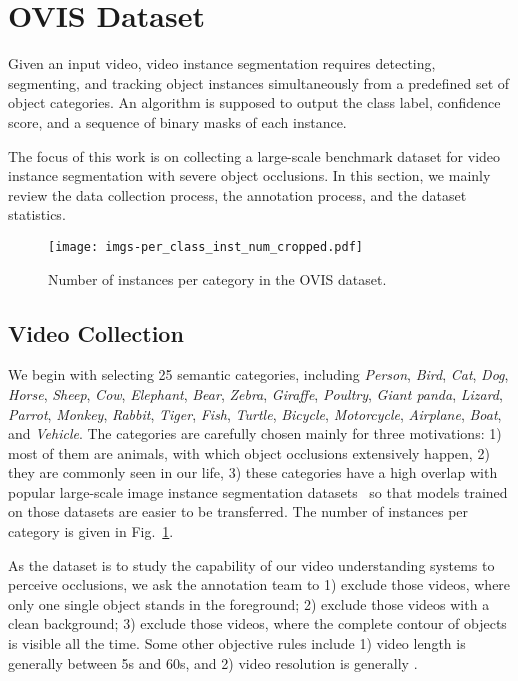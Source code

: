 \documentclass[twocolumn]{svjour3}          \smartqed  \usepackage{graphicx}
\begin{document}
\begin{sloppypar}
\section{OVIS Dataset}

Given an input video, video instance segmentation requires detecting, segmenting, and tracking object instances simultaneously from a predefined set of object categories. An algorithm is supposed to output the class label, confidence score, and a sequence of binary masks of each instance.

The focus of this work is on collecting a large-scale benchmark dataset for video instance segmentation with severe object occlusions. In this section, we mainly review the data collection process, the annotation process, and the dataset statistics.

\begin{figure}[t]
\centering
         \texttt{[image: imgs-per\_class\_inst\_num\_cropped.pdf]}
         \caption{Number of instances per category in the
         OVIS dataset.}
      \label{fig:instance_per_cate}
\end{figure}

\subsection{Video Collection}

We begin with selecting 25 semantic categories, including \textit{Person}, \textit{Bird}, \textit{Cat}, \textit{Dog}, \textit{Horse}, \textit{Sheep}, \textit{Cow}, \textit{Elephant}, \textit{Bear}, \textit{Zebra}, \textit{Giraffe}, \textit{Poultry}, \textit{Giant panda}, \textit{Lizard}, \textit{Parrot}, \textit{Monkey}, \textit{Rabbit}, \textit{Tiger}, \textit{Fish}, \textit{Turtle}, \textit{Bicycle}, \textit{Motorcycle}, \textit{Airplane}, \textit{Boat}, and \textit{Vehicle}. The categories are carefully chosen mainly for three motivations: 1) most of them are animals, with which object occlusions extensively happen, 2) they are commonly seen in our life, 3) these categories have a high overlap with popular large-scale image instance segmentation datasets~\cite{coco,lvis} so that models trained on those datasets are easier to be transferred. The number of instances per category is given in Fig.~\ref{fig:instance_per_cate}.

As the dataset is to study the capability of our video understanding systems to perceive occlusions, we ask the annotation team to 1) exclude those videos, where only one single object stands in the foreground; 2) exclude those videos with a clean background; 3) exclude those videos, where the complete contour of objects is visible all the time. Some other objective rules include 1) video length is generally between 5s and 60s, and 2) video resolution is generally .


\end{sloppypar}
\end{document}
